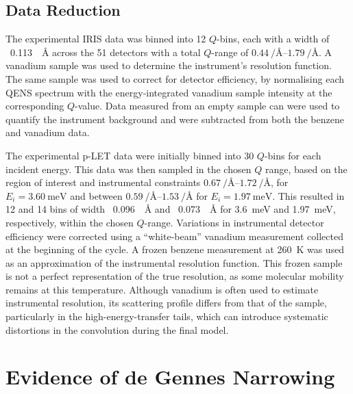 \documentclass[reprint,
               superscriptaddress,
               nobibnotes,
               amsmath,
               amssymb,
               aps,
               hidelinks, 
               pre]{revtex4-2}
\begin{document}
\subsection{Data Reduction}
\label{sec:data-red}

The experimental IRIS data was binned into \num{12} $Q$-bins, each with a width of ~\qty{0.113}{\per\angstrom} across the 51 detectors with a total $Q$-range of $\qtyrange{0.44}{1.79}{\per\angstrom}$.
A vanadium sample was used to determine the instrument's resolution function. 
The same sample was used to correct for detector efficiency, by normalising each QENS spectrum with the energy-integrated vanadium sample intensity at the corresponding $Q$-value. 
Data measured from an empty sample can were used to quantify the instrument background and were subtracted from both the benzene and vanadium data. 

The experimental p-LET data were initially binned into \num{30} $Q$-bins for each incident energy.
This data was then sampled in the chosen $Q$ range, based on the region of interest and instrumental constraints $\qtyrange{0.67}{1.72}{\per\angstrom}$, for $E_i = \qty{3.60}{\milli\electronvolt}$ and between $\qtyrange{0.59}{1.53}{\per\angstrom}$ for $E_i=\qty{1.97}{\milli\electronvolt}$. 
This resulted in 12 and 14 bins of width ~\qty{0.096}{\per\angstrom} and ~\qty{0.073}{\per\angstrom} for \qty{3.6}{\milli\electronvolt} and \qty{1.97}{\milli\electronvolt}, respectively, within the chosen $Q$-range.
Variations in instrumental detector efficiency were corrected using a “white-beam” vanadium measurement collected at the beginning of the cycle.
A frozen benzene measurement at \qty{260}{\kelvin} was used as an approximation of the instrumental resolution function. 
This frozen sample is not a perfect representation of the true resolution, as some molecular mobility remains at this temperature. 
Although vanadium is often used to estimate instrumental resolution, its scattering profile differs from that of the sample, particularly in the high-energy-transfer tails, which can introduce systematic distortions in the convolution during the final model.

\section{Evidence of de Gennes Narrowing}
\label{sec:degennes}
\end{document}
